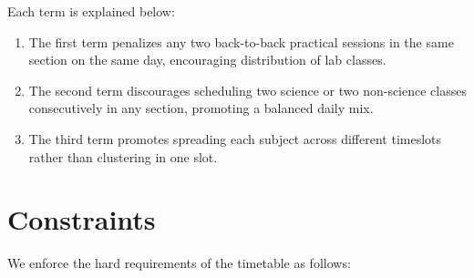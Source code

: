 \documentclass[11pt]{article}
\begin{document}
Each term is explained below:
\begin{enumerate}
  \item The first term penalizes any two back-to-back practical sessions in the same section on the same day, encouraging distribution of lab classes.
  \item The second term discourages scheduling two science or two non-science classes consecutively in any section, promoting a balanced daily mix.
  \item The third term promotes spreading each subject across different timeslots rather than clustering in one slot.
\end{enumerate}

\section{Constraints}
We enforce the hard requirements of the timetable as follows:
\end{document}
